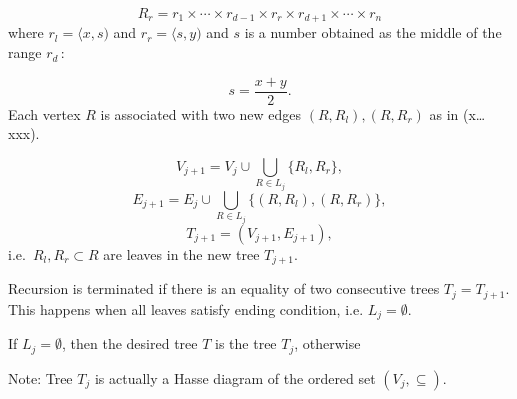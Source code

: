 \[R_r = r_1 \times  \cdots \times r_{d-1} \times  r_r \times r_{d+1} \times \cdots \times r_n  \tag{x}\]
where \(r_l = \langle x, s )\) and \(r_r = \langle s, y )\) and \(s\) is
a number obtained as the middle of the range \(r_d\,\):

\[s = \frac{x + y}{2}\tag{x}.\] Each vertex \(R\) is associated with two new
edges \((R,R_l ), (R, R_r)\) as in (x\ldots xxx).

\[V_{j+1} = V_j \cup \bigcup_{R \in L_j} \{R_l, R_r\}, \tag{x}\]
\[E_{j+1} = E_j \cup \bigcup_{R \in L_j} \{(R, R_l), (R,R_r)\}, \tag{xx}\]
\[T_{j+1} = (V_{j+1}, E_{j+1}) \tag{xxx},\] i.e.~${R_l, R_r} \subset R$ are leaves in the new tree
\(T_{j+1}\).

Recursion is terminated if there is an equality of two consecutive trees \(T_j = T_{j+1}\). This happens when all leaves satisfy ending condition, i.e. \(L_j = \emptyset\).


If \(L_j = \emptyset\), then the desired tree $T$ is the tree $T_j$, otherwise

Note: Tree \(T_{j}\) is actually a Hasse diagram of the ordered set
\((V_j,\subseteq)\).